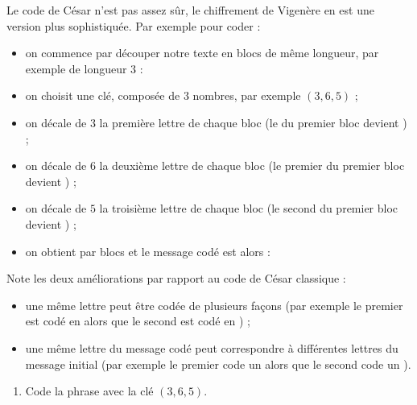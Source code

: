 \documentclass[class=report,crop=false, 12pt]{standalone}
\begin{document}
\begin{activite}
Le code de César n'est pas assez sûr, le chiffrement de Vigenère en est une version plus sophistiquée. Par exemple pour coder : 

\centerline{}

\begin{itemize}
  \item on commence par découper notre texte en blocs de même longueur, par exemple de longueur $3$ :
  
\centerline{}
 
 \item on choisit une clé, composée de $3$ nombres, par exemple $(3,6,5)$ ;
 
 \item on décale de $3$ la première lettre de chaque bloc (le  du premier bloc devient ) ; 
 
 \item on décale de $6$ la deuxième lettre de chaque bloc (le premier  du premier bloc devient ) ;
 
 \item on décale de $5$ la troisième lettre de chaque bloc (le second  du premier bloc devient ) ;
 
 \item on obtient par blocs  et le message codé est alors :
 
\centerline{}
\end{itemize}

\bigskip

Note les deux améliorations par rapport au code de César classique :
\begin{itemize}
  \item une même lettre peut être codée de plusieurs façons (par exemple le premier 
   est codé en   alors que le second est codé en ) ;
  
  \item une même lettre du message codé peut correspondre à différentes lettres du message initial (par exemple le premier  code un  alors que le second  code un ).
\end{itemize}
 
\bigskip
 

\begin{enumerate}
  \item Code la phrase  avec la clé $(3,6,5)$.
  

\end{enumerate}
\end{activite}
\end{document}
